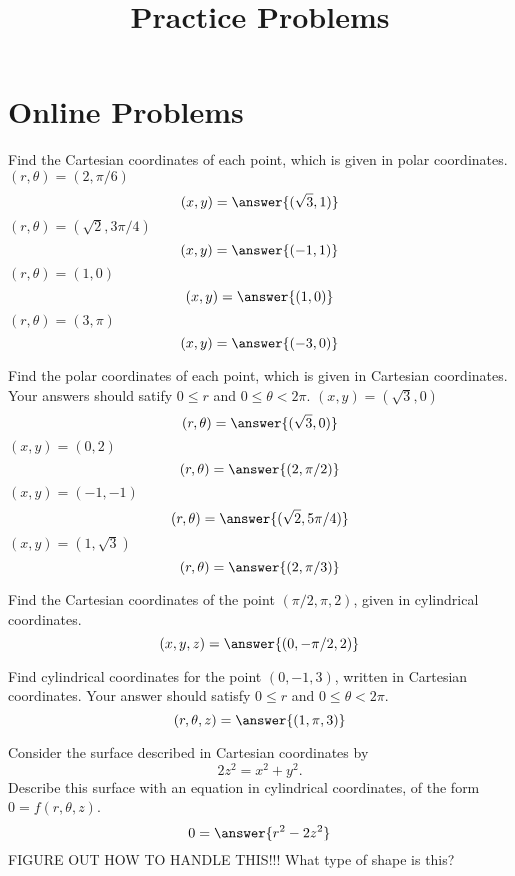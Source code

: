 \documentclass{ximera}
\title{Practice Problems}
\begin{document}
\begin{abstract}
\end{abstract}
\maketitle
\section{Online Problems}
\begin{problem}
Find the Cartesian coordinates of each point, which is given in polar coordinates.
$(r,\theta) = (2, \pi/6)$
\[
(x,y) = \answer{(\sqrt{3},1)}
\]
$(r,\theta) = (\sqrt{2}, 3\pi/4)$
\[
(x,y) = \answer{(-1,1)}
\]
$(r,\theta) = (1, 0)$
\[
(x,y) = \answer{(1,0)}
\]
$(r,\theta) = (3, \pi)$
\[
(x,y) = \answer{(-3,0)}
\]
\end{problem}

\begin{problem}
Find the polar coordinates of each point, which is given in Cartesian coordinates. Your answers should satify $0\leq r$ and $0\leq \theta < 2\pi$.
$(x,y) = (\sqrt{3},0)$
\[
(r,\theta) = \answer{(\sqrt{3},0)}
\]
$(x,y) = (0,2)$
\[
(r,\theta) = \answer{(2,\pi/2)}
\]
$(x,y) = (-1,-1)$
\[
(r,\theta) = \answer{(\sqrt{2},5\pi/4)}
\]
$(x,y) = (1,\sqrt{3})$
\[
(r,\theta) = \answer{(2,\pi/3)}
\]
\end{problem}

\begin{problem}
Find the Cartesian coordinates of the point $(\pi/2, \pi, 2)$, given in cylindrical coordinates.
\[
(x,y,z) = \answer{(0, -\pi/2, 2)}
\]
\end{problem}

\begin{problem}
Find cylindrical coordinates for the point $\left(0, -1, 3\right)$, written in Cartesian coordinates. Your answer should satisfy $0\leq r$ and $0\leq \theta <2\pi$.
\[
(r, \theta, z) = \answer{(1, \pi, 3)}
\]
\end{problem}

\begin{problem}
Consider the surface described in Cartesian coordinates by
\[
2z^2 = x^2 +y^2.
\]
Describe this surface with an equation in cylindrical coordinates, of the form $0=f(r,\theta, z)$.
\[
0=\answer{r^2-2z^2}
\]
FIGURE OUT HOW TO HANDLE THIS!!!
What type of shape is this?
\begin{multipleChoice}
\end{multipleChoice}
\end{problem}
\end{document}
